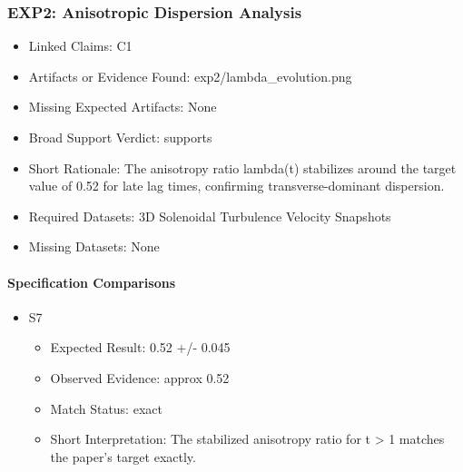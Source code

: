 \documentclass[11pt]{article}
\begin{document}
\subsubsection*{EXP2: Anisotropic Dispersion Analysis}

\begin{itemize}

\item Linked Claims: C1

\item Artifacts or Evidence Found: exp2/lambda\_evolution.png

\item Missing Expected Artifacts: None

\item Broad Support Verdict: supports

\item Short Rationale: The anisotropy ratio lambda(t) stabilizes around the target value of 0.52 for late lag times, confirming transverse-dominant dispersion.

\item Required Datasets: 3D Solenoidal Turbulence Velocity Snapshots

\item Missing Datasets: None

\end{itemize}

\paragraph{Specification Comparisons}

\begin{itemize}

\item S7

\begin{itemize}

\item Expected Result: 0.52 +/- 0.045

\item Observed Evidence: approx 0.52

\item Match Status: exact

\item Short Interpretation: The stabilized anisotropy ratio for t \textgreater{} 1 matches the paper's target exactly.

\end{itemize}

\end{itemize}
\end{document}
